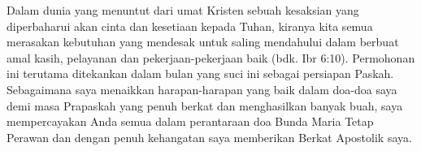 Dalam dunia yang menuntut dari umat Kristen sebuah kesaksian yang diperbaharui akan cinta dan kesetiaan kepada Tuhan, kiranya kita semua merasakan kebutuhan yang mendesak untuk saling mendahului dalam berbuat amal kasih, pelayanan dan pekerjaan-pekerjaan baik (bdk. Ibr 6:10). Permohonan ini terutama ditekankan dalam bulan yang suci ini sebagai persiapan Paskah. Sebagaimana saya menaikkan harapan-harapan yang baik dalam doa-doa saya demi masa Prapaskah yang penuh berkat dan menghasilkan banyak buah, saya mempercayakan Anda semua dalam perantaraan doa Bunda Maria Tetap Perawan dan dengan penuh kehangatan saya memberikan Berkat Apostolik saya.

\normalsize